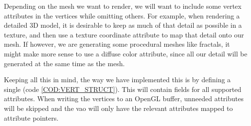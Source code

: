 Depending on the mesh we want to render,
we will want to include some vertex attributes in the vertices while omitting others.
For example,
when rendering a detailed 3D model,
it is desirable to keep as much of that detail as possible in a texture,
and then use a texture coordinate attribute to map that detail onto our mesh.
If however,
we are generating some procedural meshes like fractals,
it might make more sense to use a diffuse color attribute,
since all our detail will be generated at the same time as the mesh.

Keeping all this in mind,
the way we have implemented this is by defining a single  (code \ref{COD:VERT_STRUCT}).
This  will contain fields for all supported attributes.
When writing the vertices to an OpenGL buffer,
unneeded attributes will be skipped and the \ac{vao} will only have the relevant attributes mapped to attribute pointers.

